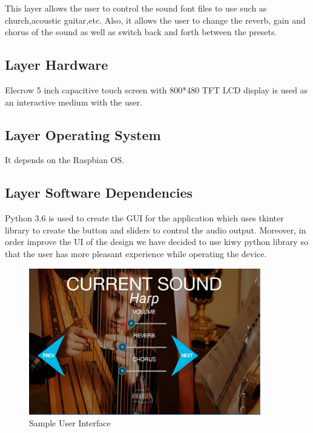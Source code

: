 This layer allows the user to control the sound font files to use such as church,acoustic guitar,etc. Also, it allows the user to change the reverb, gain and chorus of the sound as well as switch back and forth between the presets.

\subsection{Layer Hardware}
Elecrow 5 inch capacitive touch screen with 800*480 TFT LCD display is used as an interactive medium with the user.

\subsection{Layer Operating System}
It depends on the Raspbian OS.

\subsection{Layer Software Dependencies}
Python 3.6 is used to create the GUI for the application which uses tkinter library to create the button and sliders to control the audio output. Moreover, in order improve the UI of the design we have decided to use kiwy python library so that the user has more pleasant experience while operating the device.

\begin{figure}[h!]
	\centering
 	\includegraphics[width=0.90\textwidth]{images/ui.png}
 \caption{Sample User Interface}
\end{figure}




